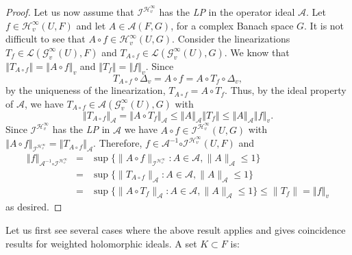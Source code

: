 \documentclass[12pt]{amsart}
\theoremstyle{plain}
\numberwithin{equation}{section}
\begin{document}
\begin{proof}
Let us now assume that $\mathcal{I}^{\mathcal{H}_{v}^{\infty }}$ has the 
\textit{LP} in the operator ideal $\mathcal{A}$. Let $f\in \mathcal{H}%
_{v}^{\infty }\left( U,F\right) $ and let $A\in \mathcal{A}\left( F,G\right) 
$, for a complex Banach space $G$. It is not difficult to see that $A\circ
f\in \mathcal{H}_{v}^{\infty }\left( U,G\right) $. Consider the linearizations $T_f\in \mathcal{L}(\mathcal{G}_{v}^{\infty }(U),F)$ and $T_{A\circ
f}\in \mathcal{L}(\mathcal{G}_{v}^{\infty }(U),G)$. We know that  $\left\Vert
T_{A\circ f}\right\Vert =\left\Vert A\circ f\right\Vert _{v}$ and $\left\Vert T_{f}\right\Vert =\left\Vert f\right\Vert _{v}$. Since
\begin{equation*}
T_{A\circ f}\circ \Delta _{v}=A\circ f=A\circ T_{f}\circ \Delta _{v},
\end{equation*}
by the uniqueness of the linearization, $T_{A\circ f}=A\circ T_{f}$. Thus, by the ideal property of $\mathcal{A}$,
we have $T_{A\circ f}\in \mathcal{A}(\mathcal{G}_{v}^{\infty }(U),G)$ with%
\begin{equation*}
\left\Vert T_{A\circ f}\right\Vert _{\mathcal{A}}=\left\Vert A\circ
T_{f}\right\Vert _{\mathcal{A}}\leq \left\Vert A\right\Vert _{\mathcal{A}%
}\left\Vert T_{f}\right\Vert \leq \left\Vert A\right\Vert _{\mathcal{A}%
}\left\Vert f\right\Vert _{v}.
\end{equation*}%
Since $\mathcal{I}^{\mathcal{H}_{v}^{\infty }}$ has the \textit{LP} in $%
\mathcal{A}$  we have $A\circ f\in \mathcal{I}^{\mathcal{H}_{v}^{\infty }}\left(
U,G\right) $ with $\left\Vert A\circ f\right\Vert _{\mathcal{I}^{\mathcal{H}%
_{v}^{\infty }}}=\left\Vert T_{A\circ f}\right\Vert _{\mathcal{A}}$. Therefore,  $f\in 
\mathcal{A}^{-1}\mathcal{\circ I}^{\mathcal{H}_{v}^{\infty }}\left(
U,F\right) $ and 
\begin{eqnarray*}
\left\Vert f\right\Vert _{\mathcal{A}^{-1}\mathcal{\circ I%
}^{\mathcal{H}_{v}^{\infty }}}&=&\sup\{ \|A\circ f\|_{\mathcal I^{\mathcal H_v^\infty}} : A\in \mathcal A, \|A\|_{\mathcal A}\leq 1\}\\
&=&  \sup\{ \|T_{A\circ f}\|_{\mathcal A} : A\in \mathcal A, \|A\|_{\mathcal A}\leq 1\}\\
&=&\sup\{ \|A\circ T_f\|_{\mathcal A} : A\in \mathcal A, \|A\|_{\mathcal A}\leq 1\}\leq \|T_f\|= \left\Vert f\right\Vert _{v}
 \end{eqnarray*}
  as desired.
\end{proof}



 
Let us first see several cases where the above result applies and gives coincidence results for weighted holomorphic ideals.   A set $K\subset F$ is:
\end{document}
